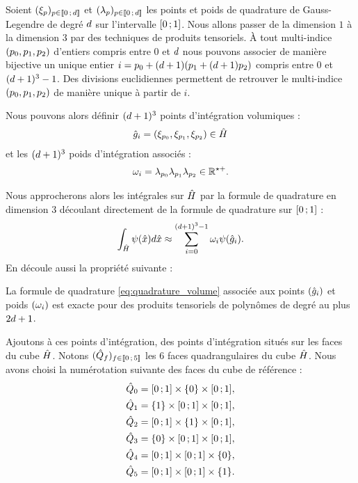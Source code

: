 Soient $(\xi_p)_{p \in \lbrack\!\lbrack0\,;\,d\rbrack\!\rbrack}$ et $(\lambda_p)_{p \in \lbrack\!\lbrack0\,;\,d\rbrack\!\rbrack}$
les points et poids de quadrature
de Gauss-Legendre de degré $d$ sur l’intervalle $\lbrack0\,;1\rbrack$.
Nous allons passer de la dimension $1$ à la dimension $3$ par des techniques
de produits tensoriels. À tout multi-indice $\left({p_{0}},{p_{1}},{p_{2}}\right)$ d’entiers compris
entre $0$ et $d$ nous pouvons associer de manière bijective un unique entier
$i = {p_{0}} + (d + 1)({p_{1}} + (d + 1){p_{2}})$ compris entre $0$ et $(d + 1)^3 - 1$.
Des divisions euclidiennes permettent de retrouver le multi-indice
$\left({p_{0}},{p_{1}},{p_{2}}\right)$ de manière unique à partir de $i$.


Nous pouvons alors définir $(d + 1)^3$ points d’intégration volumiques :
\begin{align}
	\hat{g}_{i} = \left(\xi_{p_{0}},\xi_{p_{1}},\xi_{p_{2}}\right)
	\in \hat{H}
\end{align}
et les $(d + 1)^3$ poids d’intégration associés :
\begin{align}
	\omega_{i} = \lambda_{p_{0}} \lambda_{p_{1}} \lambda_{p_{2}}
	\in \mathbb{R}^{\star +} .
\end{align}

Nous approcherons alors les intégrales sur $\hat{H}$ par la formule de
quadrature en dimension $3$ découlant directement de la formule de quadrature sur $\lbrack0\,;1\rbrack$ :
\begin{align}
	\int_{\hat{H}} \psi (\hat{x}) d\hat{x} \approx
	\sum_{i=0}^{(d + 1)^3 - 1} \omega_{i} \psi (\hat{g}_{i})
	\label{eq:quadrature_volume} .
\end{align}
En découle aussi la propriété suivante :
\begin{proposition}
	La formule de quadrature \eqref{eq:quadrature_volume} associée aux points
	$(\hat{g}_{i})$ et poids $(\omega_{i})$ est exacte pour des produits
	tensoriels de polynômes de degré au plus $2 d + 1$.
\end{proposition}


Ajoutons à ces points d’intégration, des points d’intégration situés sur les
faces du cube $\hat{H}$. Notons $(\hat{Q}_f)_{f \in \lbrack\!\lbrack0\,;\,5\rbrack\!\rbrack}$
les $6$ faces quadrangulaires du cube $\hat{H}$.
Nous avons choisi la numérotation suivante des faces du cube de référence :
\begin{equation}
	\begin{aligned}
		\hat{Q}_0 &= \lbrack0\,;1\rbrack \times \lbrace 0 \rbrace \times \lbrack0\,;1\rbrack , \\
		\hat{Q}_1 &= \lbrace 1 \rbrace \times \lbrack0\,;1\rbrack \times \lbrack0\,;1\rbrack , \\
		\hat{Q}_2 &= \lbrack0\,;1\rbrack \times \lbrace 1 \rbrace \times \lbrack0\,;1\rbrack , \\
		\hat{Q}_3 &= \lbrace 0 \rbrace \times \lbrack0\,;1\rbrack \times \lbrack0\,;1\rbrack , \\
		\hat{Q}_4 &= \lbrack0\,;1\rbrack \times \lbrack0\,;1\rbrack \times \lbrace 0 \rbrace , \\
		\hat{Q}_5 &= \lbrack0\,;1\rbrack \times \lbrack0\,;1\rbrack \times \lbrace 1 \rbrace .
	\end{aligned}
\end{equation}

